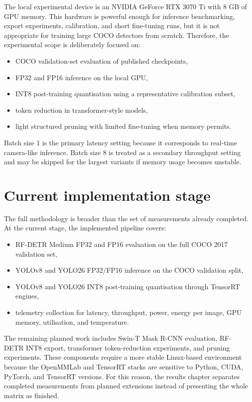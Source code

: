 \documentclass[a4paper,11pt,twoside]{report}
\theoremstyle{definition}
\begin{document}
The local experimental device is an NVIDIA GeForce RTX 3070 Ti with 8 GB of GPU memory. This hardware is powerful enough for inference benchmarking, export experiments, calibration, and short fine-tuning runs, but it is not appropriate for training large COCO detectors from scratch. Therefore, the experimental scope is deliberately focused on:

\begin{itemize}
    \item COCO validation-set evaluation of published checkpoints,
    \item FP32 and FP16 inference on the local GPU,
    \item INT8 post-training quantisation using a representative calibration subset,
    \item token reduction in transformer-style models,
    \item light structured pruning with limited fine-tuning when memory permits.
\end{itemize}

Batch size 1 is the primary latency setting because it corresponds to real-time camera-like inference. Batch size 8 is treated as a secondary throughput setting and may be skipped for the largest variants if memory usage becomes unstable.

\section{Current implementation stage}

The full methodology is broader than the set of measurements already completed. At the current stage, the implemented pipeline covers:

\begin{itemize}
    \item RF-DETR Medium FP32 and FP16 evaluation on the full COCO 2017 validation set,
    \item YOLOv8 and YOLO26 FP32/FP16 inference on the COCO validation split,
    \item YOLOv8 and YOLO26 INT8 post-training quantisation through TensorRT engines,
    \item telemetry collection for latency, throughput, power, energy per image, GPU memory, utilisation, and temperature.
\end{itemize}

The remaining planned work includes Swin-T Mask R-CNN evaluation, RF-DETR INT8 export, transformer token-reduction experiments, and pruning experiments. These components require a more stable Linux-based environment because the OpenMMLab and TensorRT stacks are sensitive to Python, CUDA, PyTorch, and TensorRT versions. For this reason, the results chapter separates completed measurements from planned extensions instead of presenting the whole matrix as finished.
\end{document}
